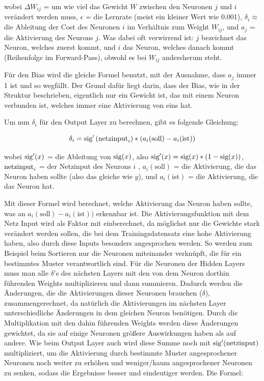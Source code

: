 \documentclass{scrartcl}
\begin{document}
	wobei $\Delta W_{ij}$ = um wie viel das Gewicht $W$ zwischen den Neuronen $j$ und $i$ verändert werden muss, $\epsilon$ = die Lernrate (meist ein kleiner Wert wie 0.001), $\delta_i \approx$ die Ableitung der Cost des Neuronen $i$ im Verhältnis zum Weight $W_{ij}$, und $a_j$ = die Aktivierung des Neurons $j$. Was dabei oft verwirrend ist: $j$ bezeichnet das Neuron, welches zuerst kommt, und $i$ das Neuron, welches danach kommt (Reihenfolge im Forward-Pass), obwohl es bei $W_{ij}$ andersherum steht.

	Für den Bias wird die gleiche Formel benutzt, mit der Ausnahme, dass $a_j$ immer 1 ist und so wegfällt. Der Grund dafür liegt darin, dass der Bias, wie in der Struktur beschrieben, eigentlich nur ein Gewicht ist, das mit einem Neuron verbunden ist, welches immer eine Aktivierung von eins hat.

	Um nun $\delta_i$ für den Output Layer zu berechnen, gibt es folgende Gleichung: 

	\[
		\delta_i = \textrm{sig} '\left({\textrm{netzinput}}_i\right) * (a_i (\textrm{soll}) - a_i (\textrm{ist})) 
	\]

	wobei $\textrm{sig} '(x)$ = die Ableitung von $\textrm{sig}(x)$, also $\textrm{sig}'(x) = \textrm{sig}(x) * (1 - \textrm{sig}(x))$, $\textrm{netzinput}_i$ = der Netzinput des Neurons $i$ , $a_i(\textrm{soll})$ = die Aktivierung, die das Neuron haben sollte (also das gleiche wie $y$), und $a_i(\textrm{ist})$ = die Aktivierung, die das Neuron hat.

	Mit dieser Formel wird berechnet, welche Aktivierung das Neuron haben sollte, was an $a_i(\textrm{soll}) - a_i(\textrm{ist}))$ erkennbar ist. Die Aktivierungsfunktion mit dem Netz Input wird als Faktor mit einberechnet, da möglichst nur die Gewichte stark verändert werden sollen, die bei dem Trainingsdatensatz eine hohe Aktivierung haben, also durch diese Inputs besonders angesprochen werden. So werden zum Beispiel beim Sortieren nur die Neuronen miteinander verknüpft, die für ein bestimmtes Muster verantwortlich sind. Für die Neuronen der Hidden Layers muss man alle $\delta$'s des nächsten Layers mit den von dem Neuron dorthin führenden Weights multiplizieren und dann summieren. Dadurch werden die Änderungen, die die Aktivierungen dieser Neuronen brauchen ($\delta$), zusammengerechnet, da natürlich die Aktivierungen im nächsten Layer unterschiedliche Änderungen in dem gleichen Neuron benötigen. Durch die Multiplikation mit den dahin führenden Weights werden diese Änderungen gewichtet, da sie auf einige Neuronen größere Auswirkungen haben als auf andere. Wie beim Output Layer auch wird diese Summe noch mit $\textrm{sig}'(\textrm{netzinput})$ multipliziert, um die Aktivierung durch bestimmte Muster angesprochener Neuronen noch weiter zu erhöhen und weniger/kaum angesprochener Neuronen zu senken, sodass die Ergebnisse besser und eindeutiger werden. Die Formel:
\end{document}
